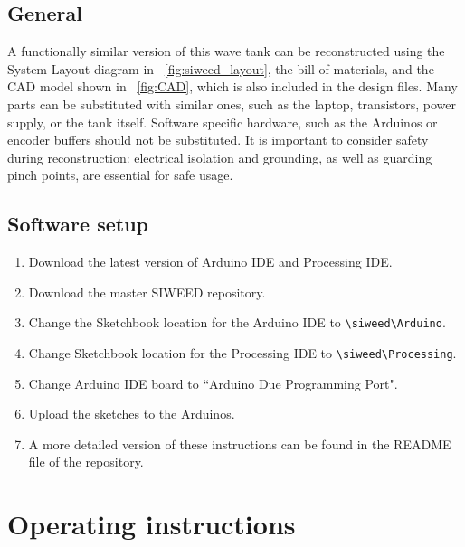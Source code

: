 \documentclass[hardware,article,submit,pdftex,moreauthors]{Definitions/mdpi}
\begin{document}
\subsection{General}
A functionally similar version of this wave tank can be reconstructed using the System Layout diagram in \figurename~\ref{fig:siweed_layout}, the bill of materials, and the CAD model shown in \figurename~\ref{fig:CAD}, which is also included in the design files.
Many parts can be substituted with similar ones, such as the laptop, transistors, power supply, or the tank itself.
Software specific hardware, such as the Arduinos or encoder buffers should not be substituted. 
It is important to consider safety during reconstruction: electrical isolation and grounding, as well as guarding pinch points, are essential for safe usage.


\subsection{Software setup}
\begin{enumerate}
\item Download the latest version of Arduino IDE and Processing IDE.
\item Download the master SIWEED repository.
\item Change the Sketchbook location for the Arduino IDE to \texttt{\textbackslash siweed\textbackslash Arduino}.
\item Change Sketchbook location for the Processing IDE to \texttt{\textbackslash siweed\textbackslash Processing}.
\item Change Arduino IDE board to ``Arduino Due Programming Port".
\item Upload the sketches to the Arduinos.
\item A more detailed version of these instructions can be found in the README file of the repository.
\end{enumerate}

\section{Operating instructions}
\end{document}
